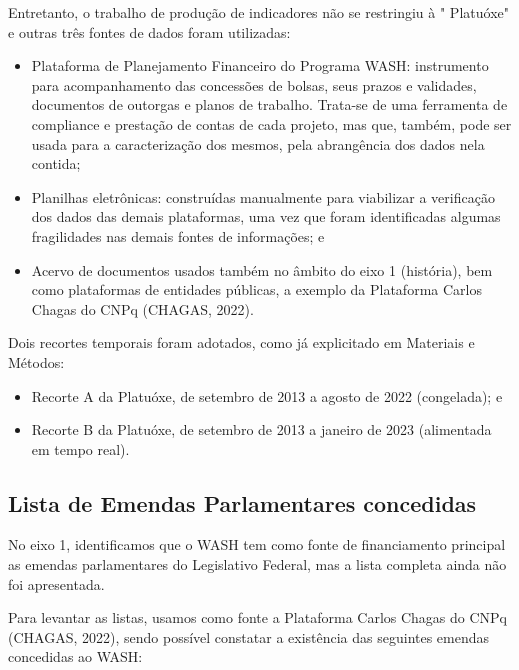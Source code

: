 Entretanto, o trabalho de produção de indicadores não se restringiu à " Platuóxe" e outras três fontes de dados foram utilizadas:


\begin{itemize}
\item Plataforma de Planejamento Financeiro do Programa WASH: instrumento para acompanhamento das concessões de bolsas, seus prazos e validades, documentos de outorgas e planos de trabalho. Trata-se de uma ferramenta de compliance e prestação de contas de cada projeto, mas que, também, pode ser usada para a caracterização dos mesmos, pela abrangência dos dados nela contida;
\item Planilhas eletrônicas: construídas  manualmente para viabilizar a verificação dos dados das demais plataformas, uma vez que foram identificadas algumas fragilidades nas demais fontes de informações; e
\item Acervo de documentos usados também no âmbito do eixo 1 (história), bem como plataformas de entidades públicas, a exemplo da Plataforma Carlos Chagas do CNPq (CHAGAS, 2022).
\end{itemize}

Dois recortes temporais foram adotados, como já explicitado em Materiais e Métodos:


\begin{itemize}
\item Recorte A da Platuóxe, de setembro de 2013 a agosto de 2022 (congelada); e
\item Recorte B da Platuóxe, de setembro de 2013 a janeiro de 2023 (alimentada em tempo real).
\end{itemize}

\subsection[Lista de Emendas Parlamentares concedidas]{Lista de Emendas Parlamentares concedidas}\label{Lista de Emendas Parlamentares concedidas}
No eixo 1, identificamos que o WASH tem como fonte de financiamento principal as emendas parlamentares do Legislativo Federal, mas a lista completa ainda não foi apresentada.

Para levantar as listas, usamos como fonte a Plataforma Carlos Chagas do CNPq (CHAGAS, 2022), sendo possível constatar a existência das seguintes emendas concedidas ao WASH:


